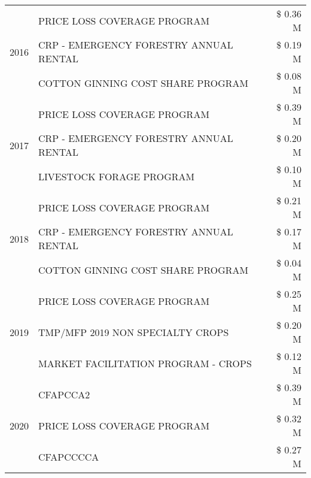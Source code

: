 \begin{tabular}{llr}
\cline{1-3}
\multirow[t]{3}{*}{2016} & PRICE LOSS COVERAGE PROGRAM & \$ 0.36 M \\
 & CRP - EMERGENCY FORESTRY ANNUAL RENTAL & \$ 0.19 M \\
 & COTTON GINNING COST SHARE PROGRAM & \$ 0.08 M \\
\cline{1-3}
\multirow[t]{3}{*}{2017} & PRICE LOSS COVERAGE PROGRAM & \$ 0.39 M \\
 & CRP - EMERGENCY FORESTRY ANNUAL RENTAL & \$ 0.20 M \\
 & LIVESTOCK FORAGE PROGRAM & \$ 0.10 M \\
\cline{1-3}
\multirow[t]{3}{*}{2018} & PRICE LOSS COVERAGE PROGRAM & \$ 0.21 M \\
 & CRP - EMERGENCY FORESTRY ANNUAL RENTAL & \$ 0.17 M \\
 & COTTON GINNING COST SHARE PROGRAM & \$ 0.04 M \\
\cline{1-3}
\multirow[t]{3}{*}{2019} & PRICE LOSS COVERAGE PROGRAM & \$ 0.25 M \\
 & TMP/MFP 2019 NON SPECIALTY CROPS & \$ 0.20 M \\
 & MARKET FACILITATION PROGRAM - CROPS & \$ 0.12 M \\
\cline{1-3}
\multirow[t]{3}{*}{2020} & CFAPCCA2 & \$ 0.39 M \\
 & PRICE LOSS COVERAGE PROGRAM & \$ 0.32 M \\
 & CFAPCCCCA & \$ 0.27 M \\
\cline{1-3}
\bottomrule
\end{tabular}
